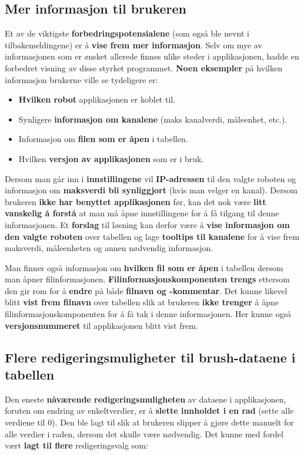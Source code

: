 \subsection{Mer informasjon til brukeren}
Et av de viktigste \textbf{forbedringspotensialene} (som også ble nevnt i tilbakemeldingene) er å \textbf{vise frem mer informasjon}. Selv om mye av informasjonen som er ønsket allerede finnes ulike steder i applikasjonen, hadde en forbedret visning av disse styrket programmet. \textbf{Noen eksempler} på hvilken informasjon brukerne ville se tydeligere er:

\begin{itemize}
    \item \textbf{Hvilken robot} applikasjonen er koblet til.
    \item Synligere \textbf{informasjon om kanalene} (maks kanalverdi, måleenhet, etc.).
    \item Informasjon om \textbf{filen som er åpen} i tabellen.
    \item Hvilken \textbf{versjon av applikasjonen} som er i bruk.
\end{itemize}

\noindent Dersom man går inn i \textbf{innstillingene} vil \textbf{IP-adressen} til den valgte roboten og informasjon om \textbf{maksverdi bli synliggjort} (hvis man velger en kanal). Dersom brukeren \textbf{ikke har benyttet applikasjonen} før, kan det nok være \textbf{litt vanskelig å forstå} at man må åpne innstillingene for å få tilgang til denne informasjonen. Et \textbf{forslag} til løsning kan derfor være å \textbf{vise informasjon om den valgte roboten} over tabellen og lage \textbf{tooltips til kanalene} for å vise frem maksverdi, måleenheten og annen nødvendig informasjon. 

Man finner også informasjon om \textbf{hvilken fil som er åpen} i tabellen dersom man åpner filinformasjonen. \textbf{Filinformasjonskomponenten trengs} ettersom den gir rom for å \textbf{endre} på både \textbf{filnavn og -kommentar}. Det kunne likevel blitt \textbf{vist frem filnavn} over tabellen slik at brukeren \textbf{ikke trenger} å åpne filinformasjonskomponenten for å få tak i denne informasjonen. Her kunne også \textbf{versjonsnummeret} til applikasjonen blitt vist frem.

\subsection{Flere redigeringsmuligheter til brush-dataene i tabellen}
Den eneste \textbf{nåværende redigeringsmuligheten} av dataene i applikasjonen, foruten om endring av enkeltverdier, er å \textbf{slette innholdet i en rad} (sette alle verdiene til 0). Den ble lagt til slik at brukeren slipper å gjøre dette manuelt for alle verdier i raden, dersom det skulle være nødvendig. Det kunne med fordel vært \textbf{lagt til flere} redigeringsvalg som:


